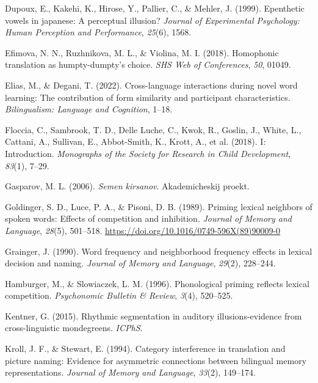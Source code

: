 \documentclass[
]{article}
\newlength{\cslhangindent}
\newenvironment{CSLReferences}[2] %
 {\begin{list}{}{%
  \setlength{\itemindent}{0pt}
  \setlength{\leftmargin}{0pt}
  \setlength{\parsep}{0pt}
  \ifodd #1
   \setlength{\leftmargin}{\cslhangindent}
   \setlength{\itemindent}{-1\cslhangindent}
  \fi
  \setlength{\itemsep}{#2\baselineskip}}}
 {\end{list}}
\begin{document}
\begin{CSLReferences}{1}{0}
Dupoux, E., Kakehi, K., Hirose, Y., Pallier, C., \& Mehler, J. (1999).
Epenthetic vowels in japanese: A perceptual illusion? \emph{Journal of
Experimental Psychology: Human Perception and Performance},
\emph{25}(6), 1568.

Efimova, N. N., Ruzhnikova, M. L., \& Violina, M. I. (2018). Homophonic
translation as humpty-dumpty's choice. \emph{SHS Web of Conferences},
\emph{50}, 01049.

Elias, M., \& Degani, T. (2022). Cross-language interactions during
novel word learning: {The} contribution of form similarity and
participant characteristics. \emph{Bilingualism: Language and
Cognition}, 1--18.

Floccia, C., Sambrook, T. D., Delle Luche, C., Kwok, R., Goslin, J.,
White, L., Cattani, A., Sullivan, E., Abbot-Smith, K., Krott, A., et al.
(2018). I: {Introduction}. \emph{Monographs of the Society for Research
in Child Development}, \emph{83}(1), 7--29.

Gasparov, M. L. (2006). \emph{Semen kirsanov}. Akademicheskij proekt.

Goldinger, S. D., Luce, P. A., \& Pisoni, D. B. (1989). Priming lexical
neighbors of spoken words: {Effects} of competition and inhibition.
\emph{Journal of Memory and Language}, \emph{28}(5), 501--518.
\url{https://doi.org/10.1016/0749-596X(89)90009-0}

Grainger, J. (1990). Word frequency and neighborhood frequency effects
in lexical decision and naming. \emph{Journal of Memory and Language},
\emph{29}(2), 228--244.

Hamburger, M., \& Slowiaczek, L. M. (1996). Phonological priming
reflects lexical competition. \emph{Psychonomic Bulletin \& Review},
\emph{3}(4), 520--525.

Kentner, G. (2015). Rhythmic segmentation in auditory illusions-evidence
from cross-linguistic mondegreens. \emph{ICPhS}.

Kroll, J. F., \& Stewart, E. (1994). Category interference in
translation and picture naming: {Evidence} for asymmetric connections
between bilingual memory representations. \emph{Journal of Memory and
Language}, \emph{33}(2), 149--174.


\end{CSLReferences}
\end{document}
